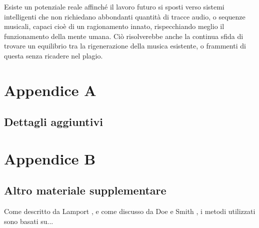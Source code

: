 \documentclass[a4paper,12pt]{report}
\begin{document}
Esiste un potenziale reale affinché il lavoro futuro si sposti verso sistemi intelligenti che non richiedano abbondanti quantità di tracce audio, o sequenze musicali, 
capaci cioè di un ragionamento innato, rispecchiando meglio il funzionamento della mente umana. 
Ciò risolverebbe anche la continua sfida di trovare un equilibrio tra la rigenerazione della musica esistente, o frammenti di questa senza ricadere nel plagio.

\appendix
\chapter{Appendice A}
\section{Dettagli aggiuntivi}

\chapter{Appendice B}
\section{Altro materiale supplementare}

Come descritto da Lamport \cite{latex}, e come discusso da Doe e Smith \cite{example_article}, i metodi utilizzati sono basati su...



\end{document}
